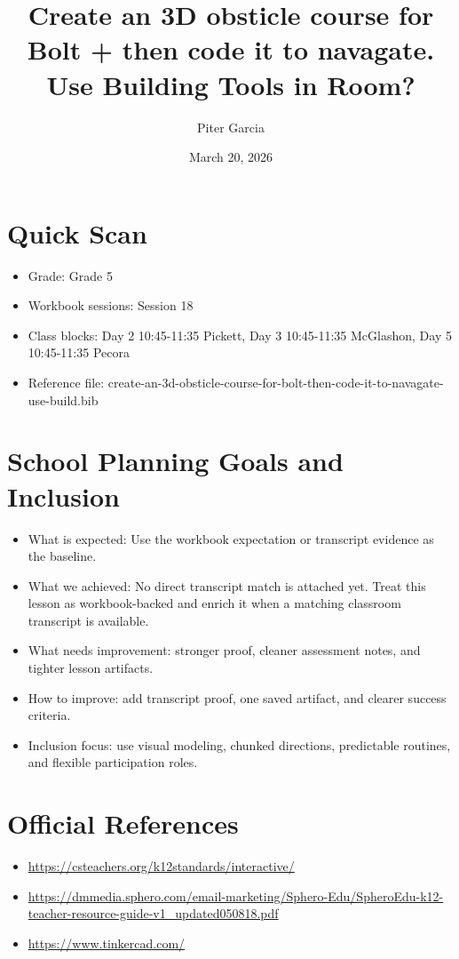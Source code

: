 \documentclass[11pt]{article}
\title{Create an 3D obsticle course for Bolt + then code it to navagate. Use Building Tools in Room?}
\author{Piter Garcia}
\date{March 20, 2026}
\begin{document}
    \maketitle
    \section*{Quick Scan}
    \begin{itemize}[leftmargin=*]
    \item Grade: Grade 5
    \item Workbook sessions: Session 18
    \item Class blocks: Day 2 10:45-11:35 Pickett, Day 3 10:45-11:35 McGlashon, Day 5 10:45-11:35 Pecora
    \item Reference file: create-an-3d-obsticle-course-for-bolt-then-code-it-to-navagate-use-build.bib
    \end{itemize}
    \section*{School Planning Goals and Inclusion}
    \begin{itemize}[leftmargin=*]
    \item What is expected: Use the workbook expectation or transcript evidence as the baseline.
    \item What we achieved: No direct transcript match is attached yet. Treat this lesson as workbook-backed and enrich it when a matching classroom transcript is available.
    \item What needs improvement: stronger proof, cleaner assessment notes, and tighter lesson artifacts.
    \item How to improve: add transcript proof, one saved artifact, and clearer success criteria.
    \item Inclusion focus: use visual modeling, chunked directions, predictable routines, and flexible participation roles.
    \end{itemize}
    \section*{Official References}
    \begin{itemize}[leftmargin=*]
    \item \url{https://csteachers.org/k12standards/interactive/}
\item \url{https://dmmedia.sphero.com/email-marketing/Sphero-Edu/SpheroEdu-k12-teacher-resource-guide-v1_updated050818.pdf}
\item \url{https://www.tinkercad.com/}

    \end{itemize}
    
\end{document}
